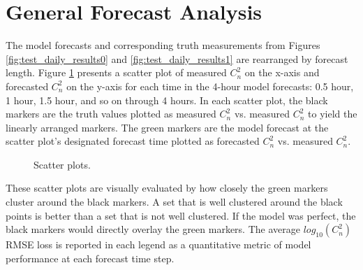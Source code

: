 \section{General Forecast Analysis}
The model forecasts and corresponding truth measurements from Figures \ref{fig:test_daily_results0} and \ref{fig:test_daily_results1} are rearranged by forecast length. Figure \ref{fig:test_scatter_results} presents a scatter plot of measured $C_{n}^{2}$ on the x-axis and forecasted $C_{n}^{2}$ on the y-axis for each time in the 4-hour model forecasts: 0.5 hour, 1 hour, 1.5 hour, and so on through 4 hours. In each scatter plot, the black markers are the truth values plotted as measured $C_{n}^{2}$ vs. measured $C_{n}^{2}$ to yield the linearly arranged markers. The green markers are the model forecast at the scatter plot's designated forecast time plotted as forecasted $C_{n}^{2}$ vs. measured $C_{n}^{2}$.
\begin{figure}[p!]
	\centering
	\hfill
	\hfill
	\hfill
	\hfill
	\caption{Scatter plots.}
	\label{fig:test_scatter_results}
\end{figure}
These scatter plots are visually evaluated by how closely the green markers cluster around the black markers. A set that is well clustered around the black points is better than a set that is not well clustered. If the model was perfect, the black markers would directly overlay the green markers. The average $log_{10}(C_{n}^{2})$ RMSE loss is reported in each legend as a quantitative metric of model performance at each forecast time step.

